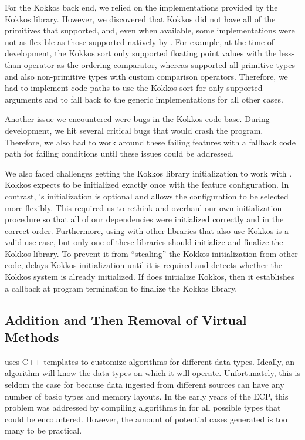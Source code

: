 For the Kokkos back end, we relied on the implementations provided by the Kokkos library.
However, we discovered that Kokkos did not have all of the primitives that \vtkm supported, and, even when available, some implementations were not as flexible as those supported natively by \vtkm.
For example, at the time of development, the Kokkos sort only supported floating point values with the less-than operator as the ordering comparator,
whereas \vtkm supported all primitive types and also non-primitive types with custom comparison operators.
Therefore, we had to implement code paths to use the Kokkos sort for only supported arguments and to fall back to the generic \vtkm implementations for all other cases.

Another issue we encountered were bugs in the Kokkos code base. During development, we hit several critical bugs that would crash the program. Therefore, we also had to work around these failing features with a fallback code path for failing conditions until these issues could be addressed.

We also faced challenges getting the Kokkos library initialization to work with \vtkm.
Kokkos expects to be initialized exactly once with the feature configuration.
In contrast, \vtkm's initialization is optional and allows the configuration to be selected more flexibly.
This required us to rethink and overhaul our own initialization procedure so that all of our dependencies were initialized correctly and in the correct order.
Furthermore, using \vtkm with other libraries that also use Kokkos is a valid use case, but only one of these libraries should initialize and finalize the Kokkos library.
To prevent it from ``stealing'' the Kokkos initialization from other code, \vtkm delays Kokkos initialization until it is required and detects whether the Kokkos system is already initialized.
If \vtkm does initialize Kokkos, then it establishes a callback at program termination to finalize the Kokkos library.

\subsection{Addition and Then Removal of Virtual Methods}
\label{sec:virtual-methods}


\vtkm uses C++ templates to customize algorithms for different data types.
Ideally, an algorithm
will know the data types on which it will operate.
Unfortunately, this is seldom the case for \vtkm because data ingested from different sources can have any number of basic types
and memory layouts.
In the early years of the ECP, this problem was addressed by compiling algorithms in \vtkm for all possible types that could be encountered.
However, the amount of potential cases generated is too many to be practical.


